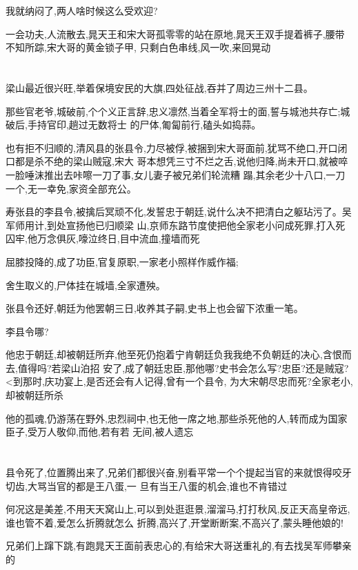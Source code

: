 ﻿\documentclass[12pt]{article}
\begin{document}
我就纳闷了,两人啥时候这么受欢迎?

一会功夫,人流散去,晁天王和宋大哥孤零零的站在原地,晁天王双手提着裤子,腰带不知所踪,宋大哥的黄金锁子甲,
只剩白色串线,风一吹,来回晃动\dldots

\section{}

梁山最近很兴旺,举着保境安民的大旗,四处征战,吞并了周边三州十二县。

那些官老爷,城破前,个个义正言辞,忠义凛然,当着全军将士的面,誓与城池共存亡;城破后,手持官印,趟过无数将士
的尸体,匍匐前行,磕头如捣蒜。

也有拒不归顺的,清风县的张县令,力尽被俘,被捆到宋大哥面前,犹骂不绝口,开口闭口都是杀不绝的梁山贼寇,宋大
哥本想凭三寸不烂之舌,说他归降,尚未开口,就被啐一脸唾沫\dldots 推出去咔嚓一刀了事,女儿妻子被兄弟们轮流糟
蹋,其余老少十八口,一刀一个,无一幸免,家资全部充公。

寿张县的李县令,被擒后冥顽不化,发誓忠于朝廷,说什么决不把清白之躯玷污了。吴军师用计,到处宣扬他已归顺梁
山,京师东路节度使把他全家老小问成死罪,打入死囚牢,他万念俱灰,嚎泣终日,目中流血,撞墙而死\dldots

屈膝投降的,成了功臣,官复原职,一家老小照样作威作福;

舍生取义的,尸体挂在城墙,全家遭殃。

张县令还好,朝廷为他罢朝三日,收养其子嗣,史书上也会留下浓重一笔。

李县令哪?

他忠于朝廷,却被朝廷所弃,他至死仍抱着宁肯朝廷负我我绝不负朝廷的决心,含恨而去,值得吗?\dldots 若梁山泊招
安了,成了朝廷忠臣,那他哪?史书会怎么写?忠臣?还是贼寇? <到那时,庆功宴上,是否还会有人记得,曾有一个县令,
为大宋朝尽忠而死?全家老小,却被朝廷所杀\dldots

他的孤魂,仍游荡在野外,忠烈祠中,也无他一席之地,那些杀死他的人,转而成为国家臣子,受万人敬仰,而他,若有若
无间,被人遗忘\dldots
\section{}

县令死了,位置腾出来了,兄弟们都很兴奋,别看平常一个个提起当官的来就恨得咬牙切齿,大骂当官的都是王八蛋,一
旦有当王八蛋的机会,谁也不肯错过

何况这是美差,不用天天窝山上,可以到处逛逛景,溜溜马,打打秋风,反正天高皇帝远,谁也管不着,爱怎么折腾就怎么
折腾,高兴了,开堂断断案,不高兴了,蒙头睡他娘的!

兄弟们上蹿下跳,有跑晁天王面前表忠心的,有给宋大哥送重礼的,有去找吴军师攀亲的\dldots
\end{document}
